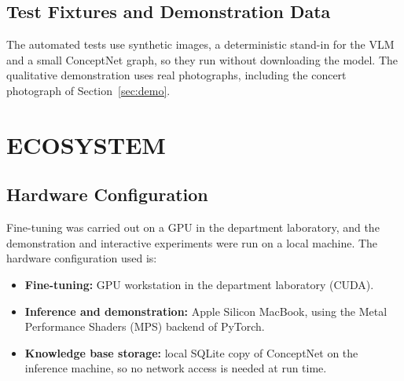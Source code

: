 \subsection{Test Fixtures and Demonstration Data}
The automated tests use synthetic images, a deterministic stand-in for the VLM and a small ConceptNet graph, so they run without downloading the model. The qualitative demonstration uses real photographs, including the concert photograph of Section~\ref{sec:demo}.

\section{ECOSYSTEM}
\subsection{Hardware Configuration}
Fine-tuning was carried out on a GPU in the department laboratory, and the demonstration and interactive experiments were run on a local machine. The hardware configuration used is:
\begin{itemize}
    \item \textbf{Fine-tuning:} GPU workstation in the department laboratory (CUDA).
    \item \textbf{Inference and demonstration:} Apple Silicon MacBook, using the Metal Performance Shaders (MPS) backend of PyTorch.
    \item \textbf{Knowledge base storage:} local SQLite copy of ConceptNet on the inference machine, so no network access is needed at run time.
\end{itemize}

